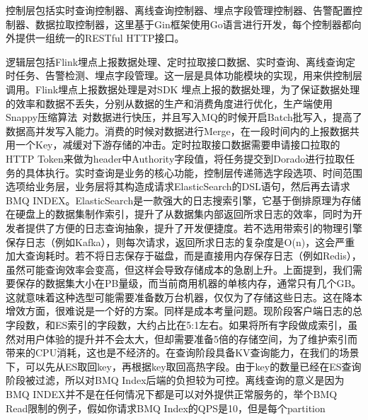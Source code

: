 控制层包括实时查询控制器、离线查询控制器、埋点字段管理控制器、告警配置控制器、数据拉取控制器，这里基于Gin框架使用Go语言进行开发，每个控制器都向外提供一组统一的RESTful HTTP接口。

逻辑层包括Flink埋点上报数据处理、定时拉取接口数据、实时查询、离线查询定时任务、告警检测、埋点字段管理。这一层是具体功能模块的实现，用来供控制层调用。Flink埋点上报数据处理是对SDK 埋点上报的数据处理，为了保证数据处理的效率和数据不丢失，分别从数据的生产和消费角度进行优化，生产端使用Snappy压缩算法~\cite{樊书华2019一种基于流媒体压缩算法的高性能集群监控系统}对数据进行快压，并且写入MQ的时候开启Batch批写入，提高了数据高并发写入能力。消费的时候对数据进行Merge，在一段时间内的上报数据共用一个Key，减缓对下游存储的冲击。定时拉取接口数据需要申请接口拉取的HTTP Token来做为header中Authority字段值，将任务提交到Dorado进行拉取任务的具体执行。实时查询是业务的核心功能，控制层传递筛选字段选项、时间范围选项给业务层，业务层将其构造成请求ElasticSearch的DSL语句，然后再去请求BMQ INDEX。ElasticSearch是一款强大的日志搜索引擎，它基于倒排原理为存储在硬盘上的数据集制作索引，提升了从数据集内部返回所求日志的效率，同时为开发者提供了方便的日志查询抽象，提升了开发便捷度。若不选用带索引的物理引擎保存日志（例如Kafka），则每次请求，返回所求日志的复杂度是O(n)，这会严重加大查询耗时。若不将日志保存于磁盘，而是直接用内存保存日志（例如Redis），虽然可能查询效率会变高，但这样会导致存储成本的急剧上升。上面提到，我们需要保存的数据集大小在PB量级，而当前商用机器的单核内存，通常只有几个GB。这就意味着这种选型可能需要准备数万台机器，仅仅为了存储这些日志。这在降本增效方面，很难说是一个好的方案。同样是成本考量问题。现阶段客户端日志的总字段数，和ES索引的字段数，大约占比在5:1左右。如果将所有字段做成索引，虽然对用户体验的提升并不会太大，但却需要准备5倍的存储空间，为了维护索引而带来的CPU消耗，这也是不经济的。在查询阶段具备KV查询能力，在我们的场景下，可以先从ES取回key，再根据key取回高热字段。由于key的数量已经在ES查询阶段被过滤，所以对BMQ Index后端的负担较为可控。离线查询的意义是因为BMQ INDEX并不是在任何情况下都是可以对外提供正常服务的，举个BMQ Read限制的例子，假如你请求BMQ Index的QPS是10，但是每个partition 